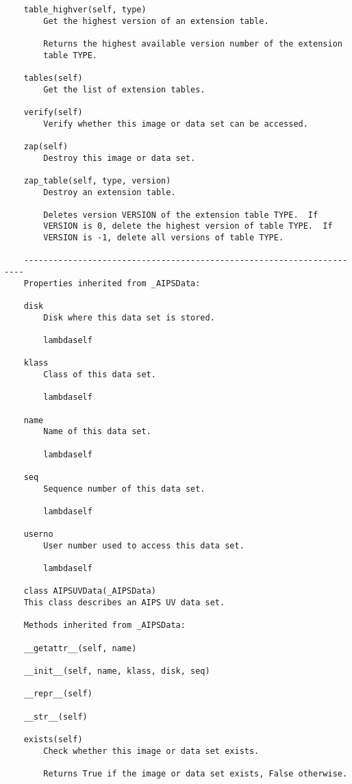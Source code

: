 \documentclass[11pt]{report}
\begin{document}
\begin{verbatim}
    table_highver(self, type)
        Get the highest version of an extension table.
        
        Returns the highest available version number of the extension
        table TYPE.
    
    tables(self)
        Get the list of extension tables.
    
    verify(self)
        Verify whether this image or data set can be accessed.
    
    zap(self)
        Destroy this image or data set.
    
    zap_table(self, type, version)
        Destroy an extension table.
        
        Deletes version VERSION of the extension table TYPE.  If
        VERSION is 0, delete the highest version of table TYPE.  If
        VERSION is -1, delete all versions of table TYPE.
    
    ----------------------------------------------------------------------
    Properties inherited from _AIPSData:
    
    disk
        Disk where this data set is stored.
    
        lambdaself
    
    klass
        Class of this data set.
    
        lambdaself
    
    name
        Name of this data set.
    
        lambdaself
    
    seq
        Sequence number of this data set.
    
        lambdaself
    
    userno
        User number used to access this data set.
    
        lambdaself
    
    class AIPSUVData(_AIPSData)
    This class describes an AIPS UV data set.
    
    Methods inherited from _AIPSData:
    
    __getattr__(self, name)
    
    __init__(self, name, klass, disk, seq)
    
    __repr__(self)
    
    __str__(self)
    
    exists(self)
        Check whether this image or data set exists.
        
        Returns True if the image or data set exists, False otherwise.
    

\end{verbatim}
\end{document}
